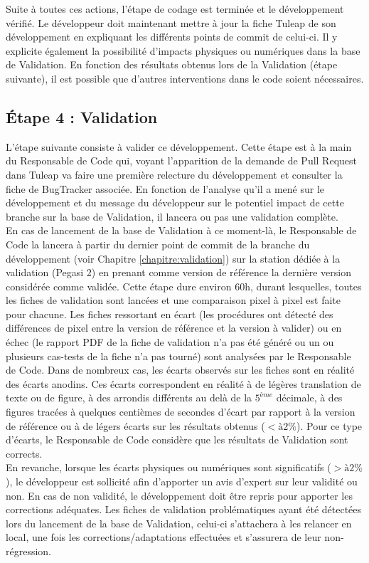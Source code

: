 Suite à toutes ces actions, l'étape de codage est terminée et le développement vérifié. Le développeur doit maintenant mettre à jour la fiche Tuleap de son développement en expliquant les différents points de commit de celui-ci. Il y explicite également la possibilité d'impacts physiques ou numériques dans la base de Validation. En fonction des résultats obtenus lors de la Validation (étape suivante), il est possible que d'autres interventions dans le code soient nécessaires.
\subsection{Étape 4 : Validation}
L'étape suivante consiste à valider ce développement. Cette étape est à la main du Responsable de Code qui, voyant l'apparition de la demande de Pull Request dans Tuleap va faire une première relecture du développement et consulter la fiche de BugTracker associée. En fonction de l'analyse qu'il a mené sur le développement et du message du développeur sur le potentiel impact de cette branche sur la base de Validation, il lancera ou pas une validation complète.\\
En cas de lancement de la base de Validation à ce moment-là, le Responsable de Code la lancera à partir du dernier point de commit de la branche du développement (voir Chapitre \ref{chapitre:validation}) sur la station dédiée à la validation (Pegasi 2) en prenant comme version de référence la dernière version considérée comme validée. Cette étape dure environ 60h, durant lesquelles, toutes les fiches de validation sont lancées et une comparaison pixel à pixel est faite pour chacune. Les fiches ressortant en écart (les procédures ont détecté des différences de pixel entre la version de référence et la version à valider) ou en échec (le rapport PDF de la fiche de validation n'a pas été généré ou un ou plusieurs cas-tests de la fiche n'a pas tourné) sont analysées par le Responsable de Code. Dans de nombreux cas, les écarts observés sur les fiches sont en réalité des écarts anodins. Ces écarts correspondent en réalité à de légères translation de texte ou de figure, à des arrondis différents au delà de la $5^{ème}$ décimale, à des figures tracées à quelques centièmes de secondes d'écart par rapport à la version de référence ou à de légers écarts sur les résultats obtenus ($< à  2 \%$). Pour ce type d'écarts, le Responsable de Code considère que les résultats de Validation sont corrects.\\
En revanche, lorsque les écarts physiques ou numériques sont significatifs ($> à 2  \%$), le développeur est sollicité afin d'apporter un avis d'expert sur leur validité ou non. En cas de non validité, le développement doit être repris pour apporter les corrections adéquates. Les fiches de validation problématiques ayant été détectées lors du lancement de la base de Validation, celui-ci s'attachera à les relancer en local, une fois les corrections/adaptations effectuées et s'assurera de leur non-régression.\\
